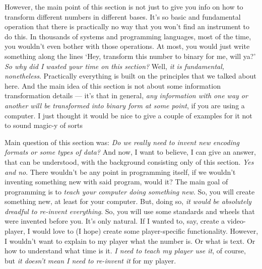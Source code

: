 \documentclass{article}
\begin{document}
            \dotfill
            
            However, the main point of this section is not just to give you info on how to transform different numbers in different bases. It's so basic and fundamental
            operation that there is practically no way that you won't find an instrument to do this. In thousands of systems and programming languages, most of the time,
            you wouldn't even bother with those operations. At most, you would just write something along the lines `Hey, transform this number to binary for me, will ya?'
            \emph{So why did I wasted your time on this section?} Well, \emph{it is fundamental, nonetheless}. Practically everything is built on the principles that we 
            talked about here. And the main idea of this section is not about some information transformation details --- it's that in general, \emph{any information
            with one way or another will be transformed into binary form at some point}, if you are using a computer. I just thought it would be nice to give a couple of examples for
            it not to sound magic-y of sorts \par

            Main question of this section was: \emph{Do we really need to invent new encoding formats or some types of data?} And now, I want to believe, I can give an answer, that
            can be understood, with the background consisting only of this section. \emph{Yes and no}. There wouldn't be any point in programming itself, if we wouldn't 
            inventing something new with said program, would it? The main goal of programming is to \emph{teach your computer doing something new}. So, you will create 
            something new, at least for your computer. But, doing so, \emph{it would be absolutely dreadful to re-invent everything}. So, you will use some standards and
            wheels that were invented before you. It's only natural. If I wanted to, say, create a video-player, I would love to (I hope) create some player-specific functionality.
            However, I wouldn't want to explain to my player what the number is. Or what is text. Or how to understand what time is it. \emph{I need to teach my player use it}, of course,
            but \emph{it doesn't mean I need to re-invent it} for my player. \par
\end{document}
